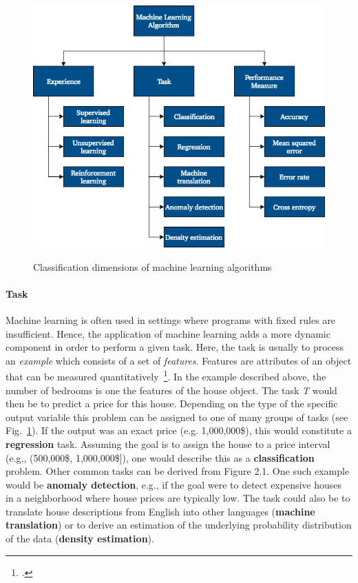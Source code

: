 \begin{figure}[h]
  \centering
  \includegraphics[height=10cm]{img/ml_classification}
  \caption{Classification dimensions of machine learning algorithms}
\label{fig:ml_classification}
\end{figure}

\paragraph{Task}

Machine learning is often used in settings where programs with fixed rules are
insufficient. Hence, the application of machine learning adds a more dynamic
component in order to perform a given task. Here, the task is usually to process
an \textit{example} which consists of a set of \textit{features}. Features are
attributes of an object that can be measured quantitatively~\footcite{Goodfellow2016}. 
In the example described above, the number of bedrooms is one the features of 
the house object. The task \textit{T} would then be to predict a price for this 
house. Depending on the type of the specific output variable this problem can 
be assigned to one of many groups of tasks (see Fig.~\ref{fig:ml_classification}). If the output was an
exact price (e.g. 1,000,000\$), this would constitute a \textbf{regression} task. 
Assuming the goal is to assign the house to a price interval (e.g., (500,000\$, 1,000,000\$]),
one would describe this as a \textbf{classification} problem. Other common tasks
can be derived from Figure 2.1. One such example would be \textbf{anomaly detection}, e.g.,
if the goal were to detect expensive houses in a neighborhood where house prices
are typically low. The task could also be to translate house descriptions from
English into other languages (\textbf{machine translation}) or to derive an
estimation of the underlying probability distribution of the data (\textbf{density estimation}).

